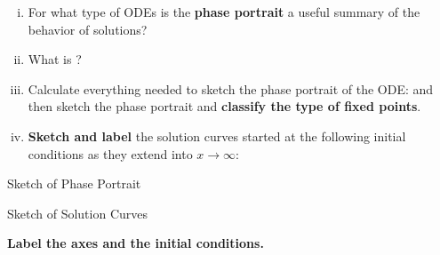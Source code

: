 \documentclass[10pt,twoside,sfsidenotes]{tufte-handout}
\begin{document}
\begin{fullwidth}
    \begin{question}
        \begin{enumerate}[(i)]
            \item For what type of ODEs is the \textbf{phase portrait} a useful summary of the behavior of solutions? \solspace{0.5in}
            \item What is ? \solspace{0.5in}
            \item Calculate everything needed to sketch the phase portrait of the ODE:
                \vary{\[\frac{dy}{dx} = y(y-2)^{2} (y^{2} + 1) e^{-y}\]}{\[\frac{dy}{dx} = y^{2}(y-2) (y^{2} + 1) e^{-y}\]}
                and then sketch the phase portrait and \textbf{classify the type of fixed points}.
            \vfill
            \item \textbf{Sketch and label} the solution curves started at the following initial conditions as they extend into \(x\to\infty\):
        \end{enumerate}
        
        \begin{minipage}{0.3\linewidth}
            \centering
            Sketch of Phase Portrait

        \end{minipage}
        \begin{minipage}{0.7\linewidth}
            \centering
            Sketch of Solution Curves


            \textbf{\small Label the axes and the initial conditions.}
        \end{minipage}
    \end{question}
\end{fullwidth}
\end{document}
